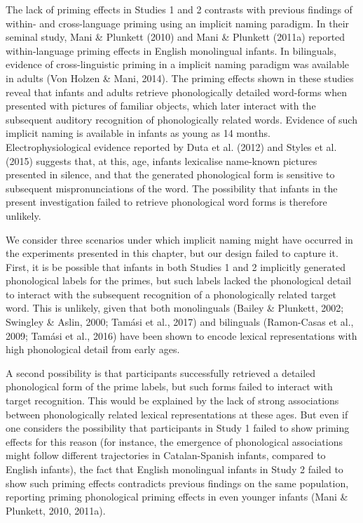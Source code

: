 \documentclass[
  12pt,
  b5paperpaper,
  twoside]{scrreprt}
\begin{document}
The lack of priming effects in Studies 1 and 2 contrasts with previous
findings of within- and cross-language priming using an implicit naming
paradigm. In their seminal study, Mani \& Plunkett (2010) and Mani \&
Plunkett (2011a) reported within-language priming effects in English
monolingual infants. In bilinguals, evidence of cross-linguistic priming
in a implicit naming paradigm was available in adults (Von Holzen \&
Mani, 2014). The priming effects shown in these studies reveal that
infants and adults retrieve phonologically detailed word-forms when
presented with pictures of familiar objects, which later interact with
the subsequent auditory recognition of phonologically related words.
Evidence of such implicit naming is available in infants as young as 14
months. Electrophysiological evidence reported by Duta et al. (2012) and
Styles et al. (2015) suggests that, at this, age, infants lexicalise
name-known pictures presented in silence, and that the generated
phonological form is sensitive to subsequent mispronunciations of the
word. The possibility that infants in the present investigation failed
to retrieve phonological word forms is therefore unlikely.

We consider three scenarios under which implicit naming might have
occurred in the experiments presented in this chapter, but our design
failed to capture it. First, it is be possible that infants in both
Studies 1 and 2 implicitly generated phonological labels for the primes,
but such labels lacked the phonological detail to interact with the
subsequent recognition of a phonologically related target word. This is
unlikely, given that both monolinguals (Bailey \& Plunkett, 2002;
Swingley \& Aslin, 2000; Tamási et al., 2017) and bilinguals
(Ramon-Casas et al., 2009; Tamási et al., 2016) have been shown to
encode lexical representations with high phonological detail from early
ages.

A second possibility is that participants successfully retrieved a
detailed phonological form of the prime labels, but such forms failed to
interact with target recognition. This would be explained by the lack of
strong associations between phonologically related lexical
representations at these ages. But even if one considers the possibility
that participants in Study 1 failed to show priming effects for this
reason (for instance, the emergence of phonological associations might
follow different trajectories in Catalan-Spanish infants, compared to
English infants), the fact that English monolingual infants in Study 2
failed to show such priming effects contradicts previous findings on the
same population, reporting priming phonological priming effects in even
younger infants (Mani \& Plunkett, 2010, 2011a).
\end{document}

